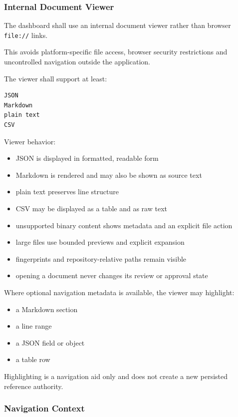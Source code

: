 \hypertarget{internal-document-viewer}{%
\subsubsection{Internal Document Viewer}\label{internal-document-viewer}}

The dashboard shall use an internal document viewer rather than browser \texttt{file://} links.

This avoids platform-specific file access, browser security restrictions and uncontrolled navigation outside the application.

The viewer shall support at least:

\begin{verbatim}
JSON
Markdown
plain text
CSV
\end{verbatim}

Viewer behavior:

\begin{itemize}
\tightlist
\item
  JSON is displayed in formatted, readable form
\item
  Markdown is rendered and may also be shown as source text
\item
  plain text preserves line structure
\item
  CSV may be displayed as a table and as raw text
\item
  unsupported binary content shows metadata and an explicit file action
\item
  large files use bounded previews and explicit expansion
\item
  fingerprints and repository-relative paths remain visible
\item
  opening a document never changes its review or approval state
\end{itemize}

Where optional navigation metadata is available, the viewer may highlight:

\begin{itemize}
\tightlist
\item
  a Markdown section
\item
  a line range
\item
  a JSON field or object
\item
  a table row
\end{itemize}

Highlighting is a navigation aid only and does not create a new persisted reference authority.

\hypertarget{navigation-context}{%
\subsubsection{Navigation Context}\label{navigation-context}}

